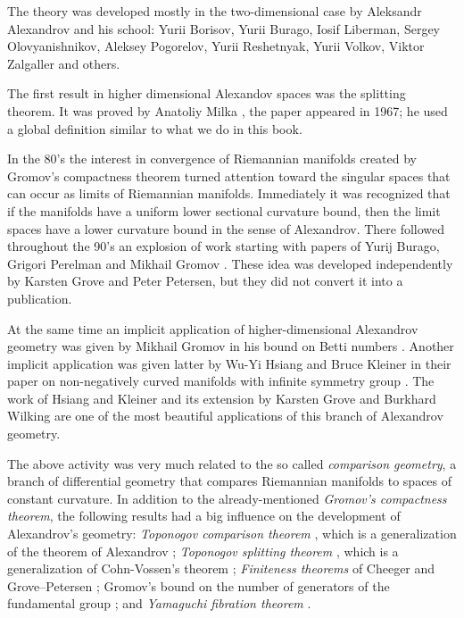 The theory was developed mostly in the two-dimensional case 
by Aleksandr Alexandrov
and his school:  
Yurii  Borisov,
Yurii  Burago,
Iosif  Liberman,
Sergey  Olovyanishnikov,
Aleksey  Pogorelov,
Yurii  Reshetnyak,
Yurii  Volkov,
Viktor  Zalgaller and others.

The first result in higher dimensional Alexandov spaces was the splitting theorem.
It was proved by Anatoliy Milka \cite{milka-line}, the paper appeared in 1967;
he used a global definition similar to what we do in this book.

In the 80's the interest in convergence of Riemannian manifolds created by Gromov's compactness theorem \cite{gromov-MS} turned attention toward the singular spaces that can occur as limits of Riemannian manifolds.
Immediately it was recognized that if the manifolds have a uniform lower sectional curvature bound, then the limit spaces have a lower curvature bound in the sense of Alexandrov. 
There followed throughout the 90's an explosion of work starting with papers of Yurij Burago, Grigori Perelman and Mikhail Gromov  \cite{burago-gromov-perelman,perelman:spaces2}.
These idea was developed independently by Karsten Grove and Peter Petersen, but they did not convert it into a publication.

At the same time an implicit application of higher-dimensional Alexandrov geometry was given by Mikhail Gromov in his bound on Betti numbers \cite{gromov:betti}.
Another implicit application was given latter by Wu-Yi Hsiang and Bruce Kleiner in their paper on non-negatively curved manifolds with infinite symmetry group \cite{hsiang-kleiner}.
The work of Hsiang and Kleiner and its extension by Karsten Grove and Burkhard Wilking \cite{grove-wilking} are one of the most beautiful applications of this branch of Alexandrov geometry.

The above activity was very much related to the so called \emph{comparison geometry},
a branch of differential geometry that compares Riemannian manifolds  to  spaces of constant curvature.
In addition to the already-mentioned \emph{Gromov's compactness theorem},
the following results had a big influence on the development of Alexandrov's geometry:
\emph{Toponogov comparison theorem} \cite{toponogov-globalization+splitting}, which is a generalization of the theorem of Alexandrov \cite{alexandrov-comparison};
\emph{Toponogov splitting theorem} \cite{toponogov-globalization+splitting}, which is a generalization of Cohn-Vossen's theorem \cite{cohn-vossen_line};
\emph{Finiteness theorems} of
Cheeger
and
Grove--Petersen \cite{cheeger-finiteness,grove-petersen:finiteness};
Gromov's bound on the number of generators of the fundamental group 
\cite[1.5]{gromov:almost-flat};
and 
\emph{Yamaguchi fibration theorem} \cite{yamaguchi-fibration}.

